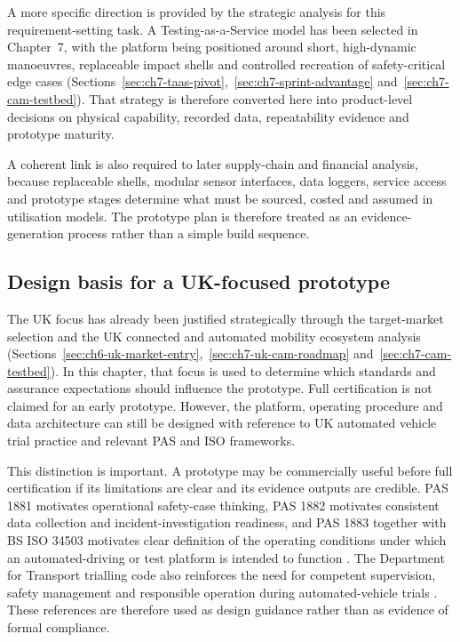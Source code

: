 A more specific direction is provided by the strategic analysis for this requirement-setting task. A Testing-as-a-Service model has been selected in Chapter~7, with the platform being positioned around short, high-dynamic manoeuvres, replaceable impact shells and controlled recreation of safety-critical edge cases (Sections~\ref{sec:ch7-taas-pivot},~\ref{sec:ch7-sprint-advantage} and~\ref{sec:ch7-cam-testbed}). That strategy is therefore converted here into product-level decisions on physical capability, recorded data, repeatability evidence and prototype maturity.

A coherent link is also required to later supply-chain and financial analysis, because replaceable shells, modular sensor interfaces, data loggers, service access and prototype stages determine what must be sourced, costed and assumed in utilisation models. The prototype plan is therefore treated as an evidence-generation process rather than a simple build sequence.

\subsection{Design basis for a UK-focused prototype}
\label{sec:ch8_uk_design_basis}

The UK focus has already been justified strategically through the target-market selection and the UK connected and automated mobility ecosystem analysis (Sections~\ref{sec:ch6-uk-market-entry},~\ref{sec:ch7-uk-cam-roadmap} and~\ref{sec:ch7-cam-testbed}). In this chapter, that focus is used to determine which standards and assurance expectations should influence the prototype. Full certification is not claimed for an early prototype. However, the platform, operating procedure and data architecture can still be designed with reference to UK automated vehicle trial practice and relevant PAS and ISO frameworks.

This distinction is important. A prototype may be commercially useful before full certification if its limitations are clear and its evidence outputs are credible. PAS 1881 motivates operational safety-case thinking, PAS 1882 motivates consistent data collection and incident-investigation readiness, and PAS 1883 together with BS ISO 34503 motivates clear definition of the operating conditions under which an automated-driving or test platform is intended to function \parencite{bsiPAS1881,bsiPAS1882,bsiPAS1883,iso34503}. The Department for Transport trialling code also reinforces the need for competent supervision, safety management and responsible operation during automated-vehicle trials \parencite{dftTriallingCode}. These references are therefore used as design guidance rather than as evidence of formal compliance.

